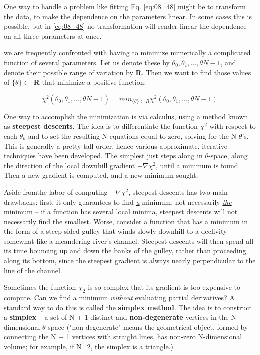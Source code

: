 One way to handle a problem like fitting Eq. \ref{eq:08_48} might be to transform the data, to make the dependence on the parameters linear. In some cases this is possible, but in \ref{eq:08_48} no transformation will render linear the dependence on all three parameters at once.

 we are frequently confronted with having to minimize numerically a complicated function of several parameters. Let us denote these by $\theta_{0}, \theta_{1}, ... , \theta{N-1}$, and denote their possible range of variation by \textbf{R}. Then we want to find those values of $\{ \theta \} \subset$ \textbf{R} that minimize a positive function:

\begin{equation}
\chi^{2} (\bar{\theta}_{0}, \bar{\theta}_{1}, ... , \bar{\theta}{N-1}) = min_{\{ \theta \} \subset R} \chi^{2} (\theta_{0}, \theta_{1}, ... , \theta{N-1})
\end{equation}

One way to accomplish the minimization is via calculus, using a method known as \textbf{steepest descents}. The idea is to differentiate the function $\chi^{2}$ with respect to each $\theta_{k}$ and to set the resulting N equations equal to zero, solving for the N $\theta$'s. This is generally a pretty tall order, hence various approximate, iterative techniques have been developed. The simplest just steps along in $\theta$-space, along the direction of the local downhill gradient $-\nabla\chi^{2}$, until a minimum is found. Then a new gradient is computed, and a new minimum sought.

Aside fromthe labor of computing $-\nabla\chi^{2}$, steepest descents has two main drawbacks: first, it only guarantees to find \underline{\textit{a}} minimum, not necessarily \underline{\textit{the}} minimum -- if a function has several local minima, steepest descents will not necessarily find the smallest. Worse, consider a function that has a minimum in the form of a steep-sided gulley that winds slowly downhill to a declivity -- somewhat like a meandering river's channel. Steepest descents will then spend all its time bouncing up and down the banks of the gulley, rather than proceeding along its bottom, since the steepest gradient is always nearly perpendicular to the line of the channel.

Sometimes the function $\chi_{2}$ is so complex that its gradient is too expensive to compute. Can we find a minimum \textit{without} evaluating partial derivatives? A standard way to do this is called the \textbf{simplex method}. The idea is to construct a \textbf{simplex} -- a set of N + 1 distinct and \textbf{non-degenerate} vertices in the N-dimensional $\theta$-space ("non-degenerate" means the geometrical object, formed by connecting the N + 1 vertices with straight lines, has non-zero N-dimensional volume; for example, if N=2, the simplex is a triangle.)

